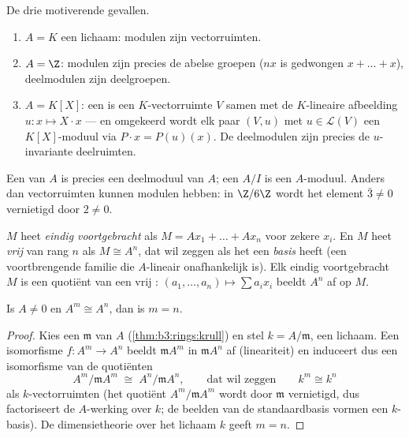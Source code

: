 \begin{example}\label{ex:b3:modules:examples}
De drie motiverende gevallen.
\begin{enumerate}
  \item $A = K$ een lichaam: modulen zijn vectorruimten.
  \item $A = \Z$: modulen zijn precies de abelse groepen ($nx$ is
        gedwongen $x + \dots + x$), deelmodulen zijn deelgroepen.
  \item $A = K[X]$: een  is een $K$-vectorruimte $V$ samen
        met de $K$-lineaire afbeelding $u\colon x \mapsto X\cdot x$
        --- en omgekeerd wordt elk paar $(V, u)$ met $u \in
        \mathcal L(V)$ een $K[X]$-moduul via $P \cdot x =
        P(u)(x)$. De deelmodulen zijn precies de $u$-invariante
        deelruimten.
\end{enumerate}
Een  van $A$ is precies een deelmoduul van $A$; een
 $A/I$ is een $A$-moduul. Anders dan vectorruimten
kunnen modulen \emph{} hebben: in $\Z/6\Z$ wordt het element
$\bar 3 \ne 0$ vernietigd door $2 \neq 0$.
\end{example}

\begin{definition}\label{def:b3:modules:free}
$M$ heet \emph{eindig voortgebracht} als $M = Ax_1 + \dots + Ax_n$ voor zekere $x_i$. En $M$
heet \emph{vrij} van rang $n$ als $M \cong A^n$,
dat wil zeggen als het een \emph{basis} heeft (een voortbrengende
familie die $A$-lineair onafhankelijk is). Elk eindig voortgebracht
$M$ is een quotiënt van een vrij : $(a_1, \dots, a_n) \mapsto
\sum a_ix_i$ beeldt $A^n$ af op $M$.
\end{definition}

\begin{proposition}\label{prop:b3:modules:rank}
Is $A \neq 0$ en $A^m \cong A^n$, dan is $m = n$.
\end{proposition}

\begin{proof}
Kies een  $\mathfrak m$ van $A$
(\cref{thm:b3:rings:krull}) en stel $k = A/\mathfrak m$, een
lichaam. Een isomorfisme $f \colon A^m \to A^n$ beeldt $\mathfrak m
A^m$ in $\mathfrak m A^n$ af (lineariteit) en induceert dus een
isomorfisme van de quotiënten
\[
A^m/\mathfrak m A^m \;\cong\; A^n/\mathfrak m A^n,
\qquad\text{dat wil zeggen}\qquad k^m \cong k^n
\]
als $k$-vectorruimten (het quotiënt $A^m/\mathfrak m A^m$ wordt
door $\mathfrak m$ vernietigd, dus factoriseert de $A$-werking over
$k$; de beelden van de standaardbasis vormen een $k$-basis). De
dimensietheorie over het lichaam $k$ geeft $m = n$.
\end{proof}

